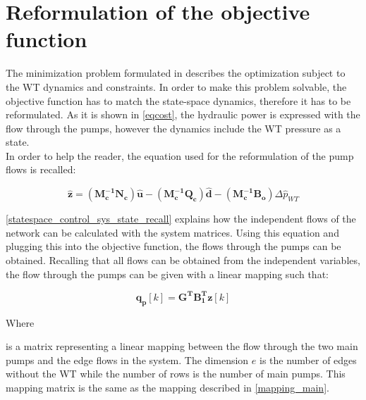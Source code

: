 \section{Reformulation of the objective function}
\label{ObjFunc_reform}

The minimization problem formulated in  describes the optimization subject to the WT dynamics and constraints. In order to make this problem solvable, the objective function has to match the state-space dynamics, therefore it has to be reformulated. As it is shown in \eqref{eqcost}, the hydraulic power is expressed with the flow through the pumps, however the dynamics include the WT pressure as a state. 
\\
\newline
In order to help the reader, the equation used for the reformulation of the pump flows is recalled:

 \begin{equation}
 \pmb{\hat{z}} =   (\pmb{M_c^{-1}}\pmb{N_c}) \pmb{\hat{u}} - (\pmb{M_c^{-1}}\pmb{Q_c}) \pmb{\hat{d}} - (\pmb{M_c^{-1}}\pmb{B_o}) \Delta \hat{p}_{WT}    
 \label{statespace_control_sys_state_recall}
\end{equation}

\eqref{statespace_control_sys_state_recall} explains how the independent flows of the network can be  calculated with the system matrices. Using this equation and plugging this into the objective function, the flows through the pumps can be obtained. Recalling that all flows can be obtained from the independent variables, the flow through the pumps can be given with a linear mapping such that: 

\begin{equation}
\bm{q_p}[k]  = \bm{G^T} \bm{B_{1}^T}  \bm{z}[k]
\label{mapping_mainP}
\end{equation}

\begin{minipage}[t]{0.20\textwidth}
Where\\
\end{minipage}
\begin{minipage}[t]{0.68\textwidth}
\vspace*{2mm}
is a matrix representing a linear mapping between the flow through the two main pumps and the edge flows in the system. The dimension $e$ is the number of edges without the WT while the number of rows is the number of main pumps. This mapping matrix is the same as the mapping described in \eqref{mapping_main}.
\end{minipage} 


